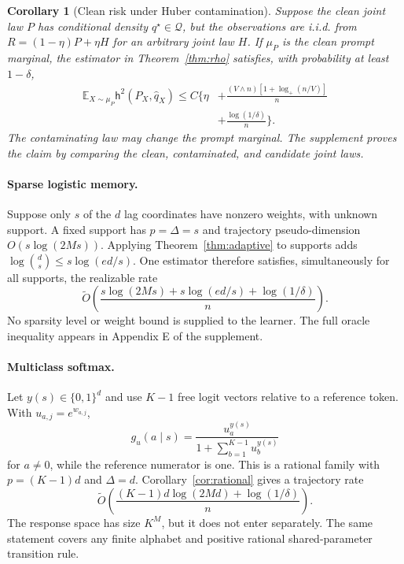 \documentclass[twoside]{article}
\newtheorem{corollary}[theorem]{Corollary}
\newcommand{\E}{\mathbb E}
\newcommand{\Q}{\mathcal Q}
\newcommand{\h}{\mathsf h}
\begin{document}
\begin{corollary}[Clean risk under Huber contamination]
\label{cor:huber}
Suppose the clean joint law $P$ has conditional density $q^\star\in\Q$, but the observations are i.i.d. from $R=(1-\eta)P+\eta H$ for an arbitrary joint law $H$. If $\mu_P$ is the clean prompt marginal, the estimator in Theorem~\ref{thm:rho} satisfies, with probability at least $1-\delta$,
\begin{align*}
 \E_{X\sim\mu_P}\h^2(P_X,\widehat q_X)
 \leq C\bigg\{\eta
 &+\frac{(V\wedge n)[1+\log_+(n/V)]}{n}\\
 &+\frac{\log(1/\delta)}{n}\bigg\}.
\end{align*}
The contaminating law may change the prompt marginal. The supplement proves the claim by comparing the clean, contaminated, and candidate joint laws.
\end{corollary}

\paragraph{Sparse logistic memory.} Suppose only $s$ of the $d$ lag coordinates have nonzero weights, with unknown support. A fixed support has $p=\Delta=s$ and trajectory pseudo-dimension $O(s\log(2Ms))$. Applying Theorem~\ref{thm:adaptive} to supports adds $\log\binom ds\leq s\log(ed/s)$. One estimator therefore satisfies, simultaneously for all supports, the realizable rate
\begin{equation}
 \widetilde O\!\left(
 \frac{s\log(2Ms)+s\log(ed/s)+\log(1/\delta)}{n}
 \right).
 \label{eq:sparse-rate}
\end{equation}
No sparsity level or weight bound is supplied to the learner. The full oracle inequality appears in Appendix E of the supplement.

\paragraph{Multiclass softmax.} Let $y(s)\in\{0,1\}^d$ and use $K-1$ free logit vectors relative to a reference token. With $u_{a,j}=e^{w_{a,j}}$,
\[ g_u(a\mid s)=\frac{u_a^{y(s)}}{1+\sum_{b=1}^{K-1}u_b^{y(s)}} \] for $a\neq0$, while the reference numerator is one. This is a rational family with $p=(K-1)d$ and $\Delta=d$. Corollary~\ref{cor:rational} gives a trajectory rate \[ \widetilde O\!\left(\frac{(K-1)d\log(2Md)+\log(1/\delta)}{n}\right). \] The response space has size $K^M$, but it does not enter separately. The same statement covers any finite alphabet and positive rational shared-parameter transition rule.
\end{document}
